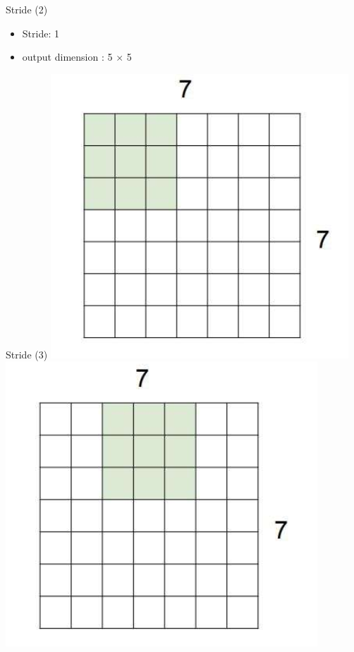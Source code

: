 \documentclass[default, aspectratio=169]{beamer}
\begin{document}
\begin{frame}{Stride (2)}
		\smallskip	
		\begin{itemize}
			\item Stride: 1
			\item output dimension : 5 $\times$ 5
		\end{itemize}
	\end{frame}
	\begin{frame}{Stride (3)}
		\includegraphics[keepaspectratio, scale=0.5]{pic/stride21.png}
		\includegraphics[keepaspectratio, scale=0.5]{pic/stride22.png}

\end{frame}
\end{document}
